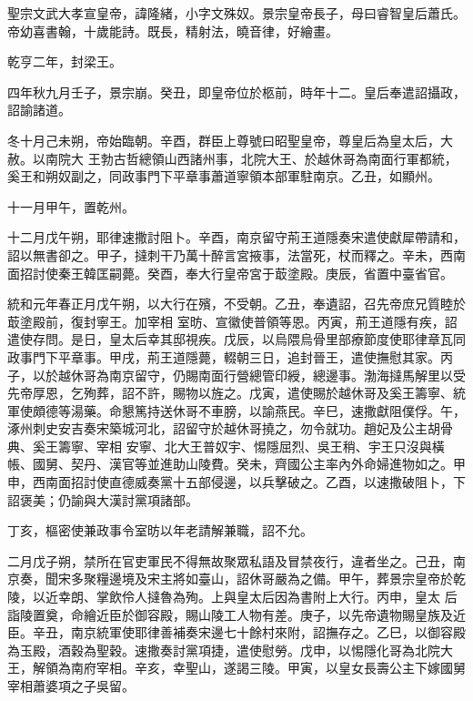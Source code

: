 
\begin{pinyinscope}

 聖宗文武大孝宣皇帝，諱隆緒，小字文殊奴。景宗皇帝長子，母曰睿智皇后蕭氏。帝幼喜書翰，十歲能詩。既長，精射法，曉音律，好繪畫。



 乾亨二年，封梁王。



 四年秋九月壬子，景宗崩。癸丑，即皇帝位於柩前，時年十二。皇后奉遣詔攝政，詔諭諸道。



 冬十月己未朔，帝始臨朝。辛酉，群臣上尊號曰昭聖皇帝，尊皇后為皇太后，大赦。以南院大
 王勃古哲總領山西諸州事，北院大王、於越休哥為南面行軍都統，奚王和朔奴副之，同政事門下平章事蕭道寧領本部軍駐南京。乙丑，如顯州。



 十一月甲午，置乾州。



 十二月戊午朔，耶律速撒討阻卜。辛酉，南京留守荊王道隱奏宋遣使獻犀帶請和，詔以無書卻之。甲子，撻刺干乃萬十醉言宮掖事，法當死，杖而釋之。辛未，西南面招討使秦王韓匡嗣薨。癸酉，奉大行皇帝宮于菆塗殿。庚辰，省置中臺省官。



 統和元年春正月戊午朔，以大行在殯，不受朝。乙丑，奉遺詔，召先帝庶兄質睦於菆塗殿前，復封寧王。加宰相
 室昉、宣徽使普領等恩。丙寅，荊王道隱有疾，詔遣使存問。是日，皇太后幸其邸視疾。戊辰，以烏隈烏骨里部療節度使耶律章瓦同政事門下平章事。甲戌，荊王道隱薨，輟朝三日，追封晉王，遣使撫慰其家。丙子，以於越休哥為南京留守，仍賜南面行營總管印綬，總邊事。渤海撻馬解里以受先帝厚恩，乞殉葬，詔不許，賜物以旌之。戊寅，遣使賜於越休哥及奚王籌寧、統軍使頗德等湯藥。命懇篤持送休哥不車膀，以諭燕民。辛巳，速撒獻阻僕俘。午，涿州刺史安吉奏宋築城河北，詔留守於越休哥撓之，勿令就功。趙妃及公主胡骨典、奚王籌寧、宰相
 安寧、北大王普奴宇、惕隱屈烈、吳王稍、宇王只沒與橫帳、國舅、契丹、漢官等並進助山陵費。癸未，齊國公主率內外命婦進物如之。甲申，西南面招討使直德威奏黨十五部侵邊，以兵擊破之。乙酉，以速撒破阻卜，下詔褒美；仍諭與大漢討黨項諸部。



 丁亥，樞密使兼政事令室昉以年老請解兼職，詔不允。



 二月戊子朔，禁所在官吏軍民不得無故聚眾私語及冒禁夜行，違者坐之。己丑，南京奏，聞宋多聚糧邊境及宋主將如臺山，詔休哥嚴為之備。甲午，葬景宗皇帝於乾陵，以近幸朗、掌飲伶人撻魯為殉。上與皇太后因為書附上大行。丙申，皇太
 后詣陵置奠，命繪近臣於御容殿，賜山陵工人物有差。庚子，以先帝遺物賜皇族及近臣。辛丑，南京統軍使耶律善補奏宋邊七十餘村來附，詔撫存之。乙巳，以御容殿為玉殿，酒穀為聖穀。速撒奏討黨項捷，遣使慰勞。戊申，以惕隱化哥為北院大王，解領為南府宰相。辛亥，幸聖山，遂謁三陵。甲寅，以皇女長壽公主下嫁國舅宰相蕭婆項之子吳留。




\end{pinyinscope}
